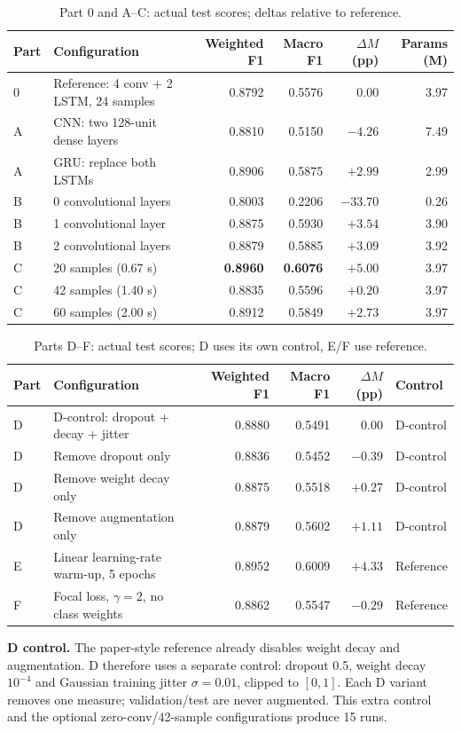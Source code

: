 \documentclass[10pt,a4paper]{article}
\begin{document}
\begin{table}[h!]
\centering\small
\caption{Part 0 and A--C: actual test scores; deltas relative to reference.}
\begin{tabular*}{\linewidth}{@{\extracolsep{\fill}}llrrrr@{}}
\toprule
Part & Configuration & Weighted F1 & Macro F1 & $\Delta M$ (pp) & Params (M)\\
\midrule
0 & Reference: 4 conv + 2 LSTM, 24 samples & 0.8792 & 0.5576 & 0.00 & 3.97\\
A & CNN: two 128-unit dense layers & 0.8810 & 0.5150 & $-4.26$ & 7.49\\
A & GRU: replace both LSTMs & 0.8906 & 0.5875 & $+2.99$ & 2.99\\
B & 0 convolutional layers & 0.8003 & 0.2206 & $-33.70$ & 0.26\\
B & 1 convolutional layer & 0.8875 & 0.5930 & $+3.54$ & 3.90\\
B & 2 convolutional layers & 0.8879 & 0.5885 & $+3.09$ & 3.92\\
C & 20 samples (0.67 s) & \textbf{0.8960} & \textbf{0.6076} & $+5.00$ & 3.97\\
C & 42 samples (1.40 s) & 0.8835 & 0.5596 & $+0.20$ & 3.97\\
C & 60 samples (2.00 s) & 0.8912 & 0.5849 & $+2.73$ & 3.97\\
\bottomrule
\end{tabular*}
\end{table}
\vspace{-9pt}
\begin{table}[h!]
\centering\small
\caption{Parts D--F: actual test scores; D uses its own control, E/F use reference.}
\begin{tabular*}{\linewidth}{@{\extracolsep{\fill}}llrrrl@{}}
\toprule
Part & Configuration & Weighted F1 & Macro F1 & $\Delta M$ (pp) & Control\\
\midrule
D & D-control: dropout + decay + jitter & 0.8880 & 0.5491 & 0.00 & D-control\\
D & Remove dropout only & 0.8836 & 0.5452 & $-0.39$ & D-control\\
D & Remove weight decay only & 0.8875 & 0.5518 & $+0.27$ & D-control\\
D & Remove augmentation only & 0.8879 & 0.5602 & $+1.11$ & D-control\\
E & Linear learning-rate warm-up, 5 epochs & 0.8952 & 0.6009 & $+4.33$ & Reference\\
F & Focal loss, $\gamma=2$, no class weights & 0.8862 & 0.5547 & $-0.29$ & Reference\\
\bottomrule
\end{tabular*}
\end{table}
\vspace{-9pt}
\textbf{D control.}
The paper-style reference already disables weight decay and augmentation. D therefore uses a separate control: dropout 0.5, weight decay $10^{-4}$ and Gaussian training jitter $\sigma=0.01$, clipped to $[0,1]$. Each D variant removes one measure; validation/test are never augmented. This extra control and the optional zero-conv/42-sample configurations produce 15 runs.
\end{document}
